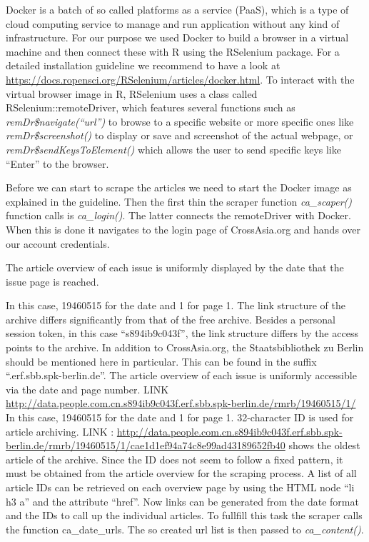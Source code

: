 \documentclass[12pt,a4paper]{article}
\begin{document}
Docker is a batch of so called platforms as a service (PaaS), which is a
type of cloud computing service to manage and run application without
any kind of infrastructure. For our purpose we used Docker to build a
browser in a virtual machine and then connect these with R using the
RSelenium package. For a detailed installation guideline we recommend to
have a look at
\url{https://docs.ropensci.org/RSelenium/articles/docker.html}. To
interact with the virtual browser image in R, RSelenium uses a class
called RSelenium::remoteDriver, which features several functions such as
\emph{remDr\$navigate(\enquote{url})} to browse to a specific website or
more specific ones like \emph{remDr\$screenshot()} to display or save
and screenshot of the actual webpage, or
\emph{remDr\$sendKeysToElement()} which allows the user to send specific
keys like \enquote{Enter} to the browser.

Before we can start to scrape the articles we need to start the Docker
image as explained in the guideline. Then the first thin the scraper
function \emph{ca\_scaper()} function calls is \emph{ca\_login()}. The
latter connects the remoteDriver with Docker. When this is done it
navigates to the login page of CrossAsia.org and hands over our account
credentials.

The article overview of each issue is uniformly displayed by the date
that the issue page is reached.

In this case, 19460515 for the date and 1 for page 1. The link structure
of the archive differs significantly from that of the free archive.
Besides a personal session token, in this case \enquote{s894ib9c043f},
the link structure differs by the access points to the archive. In
addition to CrossAsia.org, the Staatsbibliothek zu Berlin should be
mentioned here in particular. This can be found in the suffix
\enquote{.erf.sbb.spk-berlin.de}. The article overview of each issue is
uniformly accessible via the date and page number. LINK
\url{http://data.people.com.cn.s894ib9c043f.erf.sbb.spk-berlin.de/rmrb/19460515/1/}
In this case, 19460515 for the date and 1 for page 1. 32-character ID is
used for article archiving. LINK :
\url{http://data.people.com.cn.s894ib9c043f.erf.sbb.spk-berlin.de/rmrb/19460515/1/cae1d1ef94a74c8e99ad43189652fb40}
shows the oldest article of the archive. Since the ID does not seem to
follow a fixed pattern, it must be obtained from the article overview
for the scraping process. A list of all article IDs can be retrieved on
each overview page by using the HTML node \enquote{li h3 a} and the
attribute \enquote{href}. Now links can be generated from the date
format and the IDs to call up the individual articles. To fullfill this
task the scraper calls the function ca\_date\_urls. The so created url
list is then passed to \emph{ca\_content()}.
\end{document}
